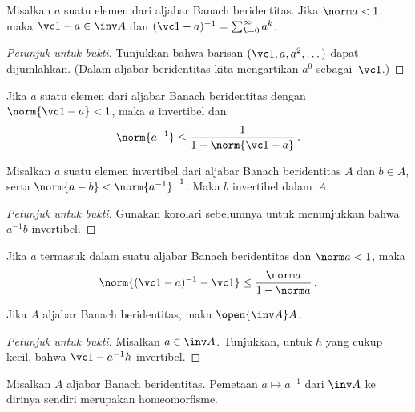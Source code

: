 
\begin{prop}\label{prop_Neumann_series} Misalkan $a$ suatu elemen dari aljabar Banach beridentitas.
Jika $\norm a < 1$, maka
$\vc 1 - a \in \inv A$ dan $(\vc 1 - a)^{-1} = \sum_{k=0}^\infty a^k$.
\end{prop}

\begin{proof}[\emph{Petunjuk untuk bukti}] Tunjukkan bahwa barisan $(\vc 1, a, a^2, \dots)$
dapat dijumlahkan. (Dalam aljabar beridentitas kita mengartikan $a^0$ sebagai~$\vc 1$.)  \ns
\end{proof}

\begin{cor}\label{cor_Neumann_series} Jika $a$ suatu elemen dari aljabar Banach beridentitas dengan $\norm{\vc 1 - a} < 1$, maka $a$ invertibel dan
    \[ \norm{a^{-1}} \le \frac{1}{1 - \norm{\vc 1 - a}}\,.  \]
\end{cor}

\begin{cor}\label{cor2_Neumann_series} Misalkan $a$ suatu elemen invertibel dari aljabar Banach beridentitas $A$ dan $b \in A$,
serta $\norm{a - b} < \norm{a^{-1}}^{-1}$. Maka $b$ invertibel dalam~$A$.
\end{cor}

\begin{proof}[\emph{Petunjuk untuk bukti}] Gunakan korolari sebelumnya untuk menunjukkan bahwa $a^{-1}b$ invertibel.
\ns \end{proof}

\begin{cor} Jika $a$ termasuk dalam suatu aljabar Banach beridentitas dan $\norm a < 1$, maka
   \[ \norm{(\vc 1 - a)^{-1} - \vc 1} \le \frac{\norm a}{1 - \norm a}\,. \]
\end{cor}

\begin{prop}\label{000644fa} Jika $A$ aljabar Banach beridentitas, maka $\open{\inv A}A$.
\end{prop}

\begin{proof}[\emph{Petunjuk untuk bukti}] Misalkan $a \in \inv A$. Tunjukkan, untuk $h$ yang cukup kecil,
bahwa $\vc 1 - a^{-1}h$ invertibel.  \ns
\end{proof}

\begin{prop}\label{000646fa} Misalkan $A$ aljabar Banach beridentitas. Pemetaan $a \mapsto a^{-1}$ dari $\inv A$ ke
dirinya sendiri merupakan homeomorfisme.
\end{prop}

